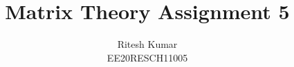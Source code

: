 \documentclass[journal,12pt,twocolumn]{IEEEtran}
\DeclareMathOperator*{\Res}{Res}
\begin{document}
%


\newtheorem{theorem}{Theorem}[section]
\newtheorem{problem}{Problem}
\newtheorem{proposition}{Proposition}[section]
\newtheorem{lemma}{Lemma}[section]
\newtheorem{corollary}[theorem]{Corollary}
\newtheorem{example}{Example}[section]
\newtheorem{definition}[problem]{Definition}

\newcommand{\BEQA}{\begin{eqnarray}}
\newcommand{\EEQA}{\end{eqnarray}}
\newcommand{\define}{\stackrel{\triangle}{=}}

%
\providecommand{\mbf}{\mathbf}
\providecommand{\pr}[1]{\ensuremath{\Pr\left(#1\right)}}
\providecommand{\qfunc}[1]{\ensuremath{Q\left(#1\right)}}
\providecommand{\sbrak}[1]{\ensuremath{{}\left[#1\right]}}
\providecommand{\lsbrak}[1]{\ensuremath{{}\left[#1\right.}}
\providecommand{\rsbrak}[1]{\ensuremath{{}\left.#1\right]}}
\providecommand{\brak}[1]{\ensuremath{\left(#1\right)}}
\providecommand{\lbrak}[1]{\ensuremath{\left(#1\right.}}
\providecommand{\rbrak}[1]{\ensuremath{\left.#1\right)}}
\providecommand{\cbrak}[1]{\ensuremath{\left\{#1\right\}}}
\providecommand{\lcbrak}[1]{\ensuremath{\left\{#1\right.}}
\providecommand{\rcbrak}[1]{\ensuremath{\left.#1\right\}}}
\theoremstyle{remark}
\newtheorem{rem}{Remark}
\newcommand{\sgn}{\mathop{\mathrm{sgn}}}
\providecommand{\abs}[1]{\left\vert#1\right\vert}
\providecommand{\res}[1]{\Res\displaylimits_{#1}} 
\providecommand{\norm}[1]{\left\lVert#1\right\rVert}
\providecommand{\mtx}[1]{\mathbf{#1}}
\providecommand{\mean}[1]{E\left[ #1 \right]}
\providecommand{\fourier}{\overset{\mathcal{F}}{ \rightleftharpoons}}
\providecommand{\system}{\overset{\mathcal{H}}{ \longleftrightarrow}}
\newcommand{\solution}{\noindent \textbf{Solution: }}
\newcommand{\cosec}{\,\text{cosec}\,}
\providecommand{\dec}[2]{\ensuremath{\overset{#1}{\underset{#2}{\gtrless}}}}
\newcommand{\myvec}[1]{\ensuremath{\begin{pmatrix}#1\end{pmatrix}}}
\newcommand{\mydet}[1]{\ensuremath{\begin{vmatrix}#1\end{vmatrix}}}
\makeatletter
{}
\makeatother
\let\StandardTheFigure\thefigure
\let\vec\mathbf
\renewcommand{\thefigure}{\theproblem}
\def\putbox#1#2#3{\makebox[0in][l]{\makebox[#1][l]{}\raisebox{\baselineskip}[0in][0in]{\raisebox{#2}[0in][0in]{#3}}}}
     \def\rightbox#1{\makebox[0in][r]{#1}}
     \def\centbox#1{\makebox[0in]{#1}}
     \def\topbox#1{\raisebox{-\baselineskip}[0in][0in]{#1}}
     \def\midbox#1{\raisebox{-0.5\baselineskip}[0in][0in]{#1}}
\vspace{3cm}
\title{Matrix Theory Assignment 5}
\author{Ritesh Kumar \\ EE20RESCH11005}
\end{document}
